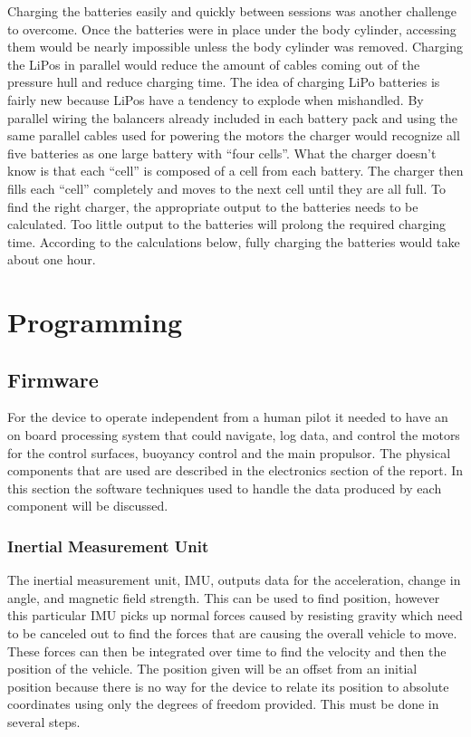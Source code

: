 \documentclass{report}
\begin{document}
Charging the batteries easily and quickly between sessions was another challenge to overcome.  Once the batteries were in place under the body cylinder, accessing them would be nearly impossible unless the body cylinder was removed.  Charging the LiPos in parallel would reduce the amount of cables coming out of the pressure hull and reduce charging time.  The idea of charging LiPo batteries is fairly new because LiPos have a tendency to explode when mishandled.  By parallel wiring the balancers already included in each battery pack and using the same parallel cables used for powering the motors the charger would recognize all five batteries as one large battery with “four cells”.  What the charger doesn’t know is that each “cell” is composed of a cell from each battery.  The charger then fills each “cell” completely and moves to the next cell until they are all full.  To find the right charger, the appropriate output to the batteries needs to be calculated.  Too little output to the batteries will prolong the required charging time.  According to the calculations below, fully charging the batteries would take about one hour. 
\section{Programming}
\subsection{Firmware}
For the device to operate independent from a human pilot it needed to have an on board processing system that could navigate, log data, and control the motors for the control surfaces, buoyancy control and the main propulsor. The physical components that are used are described in the electronics section of the report. In this section the software techniques used to handle the data produced by each component will be discussed.
\subsubsection{Inertial Measurement Unit}
The inertial measurement unit, IMU, outputs data for the acceleration, change in angle, and magnetic field strength. This can be used to find position, however this particular IMU picks up normal forces caused by resisting gravity which need to be  canceled out to find the forces that are causing the overall vehicle to move. These forces can then be integrated over time to find the velocity and then the position of the vehicle. The position given will be an offset from an initial position because there is no way for the device to relate its position to absolute coordinates using only the degrees of freedom provided. This must be done in several steps.
\end{document}
